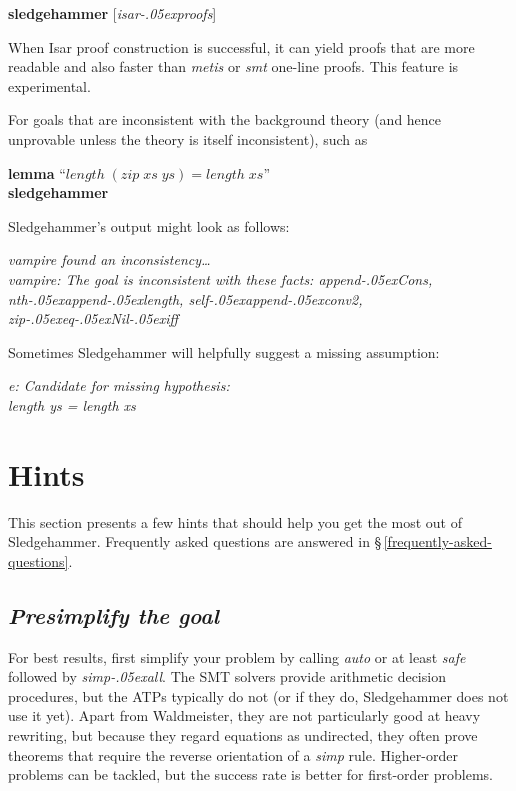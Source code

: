 \documentclass[a4paper,12pt]{article}
\let\oldS=\S
\def\S{\oldS\,}
\renewcommand\_{\hbox{\textunderscore\kern-.05ex}}
\begin{document}
\prew
\textbf{sledgehammer} [\textit{isar\_proofs}]
\postw

When Isar proof construction is successful, it can yield proofs that are more
readable and also faster than \textit{metis} or \textit{smt} one-line
proofs. This feature is experimental.

For goals that are inconsistent with the background theory (and hence unprovable
unless the theory is itself inconsistent), such as

\prew
\textbf{lemma} ``$\mathit{length}\; (\mathit{zip}\; \mathit{xs}\; \mathit{ys}) = \mathit{length}\; \mathit{xs}$'' \\
\textbf{sledgehammer}
\postw

Sledgehammer's output might look as follows:

\prew
\slshape
vampire found an inconsistency\ldots \\
vampire: The goal is inconsistent with these facts: append\_Cons, nth\_append\_length, self\_append\_conv2, zip\_eq\_Nil\_iff
\postw

Sometimes Sledgehammer will helpfully suggest a missing assumption:

\prew
\slshape
e: Candidate for missing hypothesis: \\
length ys = length xs
\postw

\section{Hints}
\label{hints}

This section presents a few hints that should help you get the most out of
Sledgehammer. Frequently asked questions are answered in
\S\ref{frequently-asked-questions}.

\newcommand\point[1]{\subsection{\slshape #1}}


\point{Presimplify the goal}

For best results, first simplify your problem by calling \textit{auto} or at
least \textit{safe} followed by \textit{simp\_all}. The SMT solvers provide
arithmetic decision procedures, but the ATPs typically do not (or if they do,
Sledgehammer does not use it yet). Apart from Waldmeister, they are not
particularly good at heavy rewriting, but because they regard equations as
undirected, they often prove theorems that require the reverse orientation of a
\textit{simp} rule. Higher-order problems can be tackled, but the success rate
is better for first-order problems.
\end{document}
